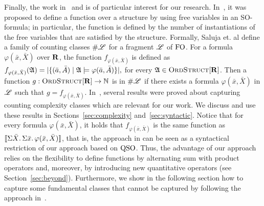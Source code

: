 Finally, the work in~\cite{SalujaST95} and \cite{ComptonG96} is of particular interest for our research. 
In~\cite{SalujaST95}, it was proposed to define a function over a structure by using free variables in an SO-formula; in particular, the function is defined by the number of instantiations of the free variables that are satisfied by the structure.
Formally, Saluja et. al \cite{SalujaST95} define a family of counting classes $\#\mathscr{L}$ for a fragment $\mathscr{L}$ of ${\rm FO}$. For a formula $\varphi(\bar{x},\bar{X})$ over $\mathbf{R}$, the function $f_{\varphi(\bar x, \bar X)}$ is defined as
$
f_{\varphi(\bar x, \bar X)}(\mathfrak{A}) = \vert \{(\bar{a},\bar{A}) \mid \mathfrak{A}\models\varphi(\bar{a},\bar{A})\}\vert,
$
for every $\mathfrak{A}\in\text{\sc OrdStruct}[\mathbf{R}]$. Then a function $g:\text{\sc OrdStruct}[\mathbf{R}]\to\mathbb{N}$ is in $\#\mathscr{L}$ if there exists a formula $\varphi(\bar{x},\bar{X})$ in $\mathscr{L}$ such that $g = f_{\varphi(\bar x, \bar X)}$.
In~\cite{SalujaST95}, several results were proved about capturing counting complexity classes which are relevant for our work. We discuss and use these results in Sections~\ref{sec:complexity} and~\ref{sec:syntactic}.
Notice that for every formula $\varphi(\bar{x},\bar{X})$, it holds that $f_{\varphi(\bar{x},\bar{X})}$ is the same function as ${\llbracket{}{\Sigma{\bar{X}}.\, \Sigma{\bar{x}}.\, \varphi(\bar{x},\bar{X})}\rrbracket}$, that is, the approach in \cite{SalujaST95} can be seen as a syntactical restriction of our approach based on ${\rm QSO}$. 
Thus, the advantage of our approach relies on the flexibility to define functions by alternating sum with product operators and, moreover, by introducing new quantitative operators (see Section~\ref{sec:beyond}).
Furthermore, we show in the following section how to capture some fundamental classes that cannot be captured by following the approach in~\cite{SalujaST95}.
